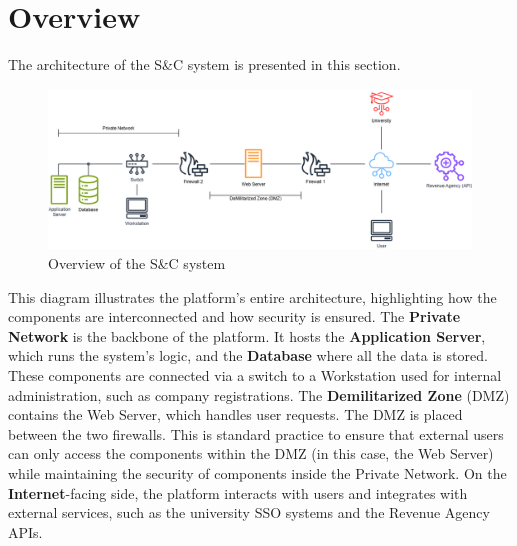 \section{Overview}
The architecture of the S\&C system is presented in this section.
\begin{figure}[H]
    \centering
    \includegraphics[width=15cm]{images/architectural design/overview.png}
    \caption{Overview of the S\&C system}
\end{figure}
This diagram illustrates the platform's entire architecture, highlighting how the components are interconnected and how security is ensured. 
The \textbf{Private Network} is the backbone of the platform. It hosts the \textbf{Application Server}, which runs the system's logic, and the \textbf{Database} where all the data is stored. These components are connected via a switch to a Workstation used for internal administration, such as company registrations.\newline
The \textbf{Demilitarized Zone} (DMZ) contains the Web Server, which handles user requests. 
The DMZ is placed between the two firewalls. This is standard practice to ensure that external users can only access the components within the DMZ (in this case, the Web Server) while maintaining the security of components inside the Private Network.\newline
On the \textbf{Internet}-facing side, the platform interacts with users and integrates with external services, such as the university SSO systems and the Revenue Agency APIs.
\pagebreak
